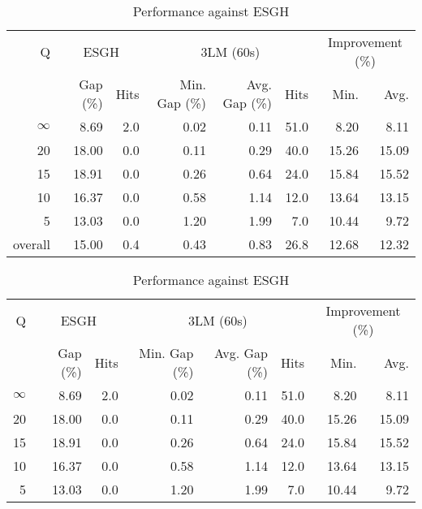 \begin{table}[H]
\centering
\caption{Performance against ESGH}
\label{tab:3lm_resuts_kritikos1}
\begin{tabular}{r rr rrr rr}
\toprule
       Q & \multicolumn{2}{c}{ESGH} & \multicolumn{3}{c}{3LM (60s)} & \multicolumn{2}{c}{Improvement (\%)} \\
         & Gap (\%) & Hits & Min. Gap (\%) & Avg. Gap (\%) & Hits &             Min. &  Avg. \\
\midrule
$\infty$ &     8.69 &  2.0 &          0.02 &          0.11 & 51.0 &             8.20 &  8.11 \\
      20 &    18.00 &  0.0 &          0.11 &          0.29 & 40.0 &            15.26 & 15.09 \\
      15 &    18.91 &  0.0 &          0.26 &          0.64 & 24.0 &            15.84 & 15.52 \\
      10 &    16.37 &  0.0 &          0.58 &          1.14 & 12.0 &            13.64 & 13.15 \\
       5 &    13.03 &  0.0 &          1.20 &          1.99 &  7.0 &            10.44 &  9.72 \\
\midrule
 overall &    15.00 &  0.4 &          0.43 &          0.83 & 26.8 &            12.68 & 12.32 \\
\bottomrule
\end{tabular}
\end{table}\begin{table}[H]
\centering
\caption{Performance against ESGH}
\label{tab:3lm_resuts_kritikos1}
\begin{tabular}{r rr rrr rr}
\toprule
       Q & \multicolumn{2}{c}{ESGH} & \multicolumn{3}{c}{3LM (60s)} & \multicolumn{2}{c}{Improvement (\%)} \\
         & Gap (\%) & Hits & Min. Gap (\%) & Avg. Gap (\%) & Hits &             Min. &  Avg. \\
\midrule
$\infty$ &     8.69 &  2.0 &          0.02 &          0.11 & 51.0 &             8.20 &  8.11 \\
      20 &    18.00 &  0.0 &          0.11 &          0.29 & 40.0 &            15.26 & 15.09 \\
      15 &    18.91 &  0.0 &          0.26 &          0.64 & 24.0 &            15.84 & 15.52 \\
      10 &    16.37 &  0.0 &          0.58 &          1.14 & 12.0 &            13.64 & 13.15 \\
       5 &    13.03 &  0.0 &          1.20 &          1.99 &  7.0 &            10.44 &  9.72 \\

\end{tabular}
\end{table}
